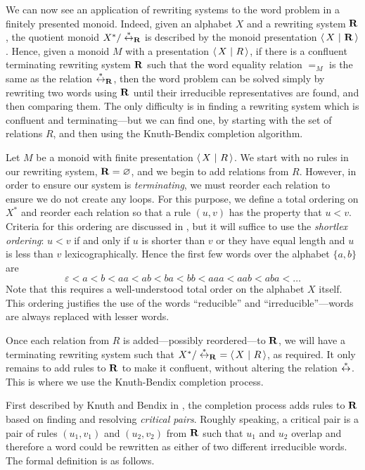 We can now see an application of rewriting systems to the word problem in a
finitely presented monoid.  Indeed, given an alphabet $X$ and a rewriting system
$\mathbf{R}$, the quotient monoid $X^* / \stackrel{*}{\leftrightarrow}_{\mathbf{R}}$ is described by the
monoid presentation $\left\langle\,X ~\middle|~ \mathbf{R}\,\right\rangle$.  Hence, given a monoid $M$ with a
presentation $\left\langle\,X ~\middle|~ R\,\right\rangle$, if there is a confluent terminating rewriting system
$\mathbf{R}$ such that the word equality relation $=_M$ is the same as the
relation $\stackrel{*}{\leftrightarrow}_{\mathbf{R}}$, then the word problem can be solved
simply by rewriting two words using $\mathbf{R}$ until their irreducible
representatives are found, and then comparing them.  The only difficulty is in
finding a rewriting system which is confluent and terminating---but we can find
one, by starting with the set of relations $R$, and then using the Knuth-Bendix
completion algorithm.

Let $M$ be a monoid with finite presentation $\left\langle\,X ~\middle|~ R\,\right\rangle$.
We start with no rules in our rewriting system, $\mathbf{R} = \varnothing$, and
we begin to add relations from $R$.  However, in order to ensure our system is
\textit{terminating}, we must reorder each relation to ensure we do not create
any loops.  For this purpose, we define a total ordering on $X^*$ and reorder
each relation so that a rule $(u, v)$ has the property that $u < v$.  Criteria
for this ordering are discussed in \cite[p.~420]{cgt}, but it will suffice to
use the \textit{shortlex ordering}: $u < v$ if and only if $u$ is shorter than
$v$ or they have equal length and $u$ is less than $v$ lexicographically.  Hence the
first few words over the alphabet $\{a, b\}$ are
$$\varepsilon < a < b < aa < ab < ba < bb < aaa < aab < aba < \ldots$$
Note that this requires a well-understood total order on the alphabet $X$
itself.  This ordering justifies the use of the words ``reducible'' and
``irreducible''---words are always replaced with lesser words.

Once each relation from $R$ is added---possibly reordered---to $\mathbf{R}$, we
will have a terminating rewriting system such that
$X^* / \stackrel{*}{\leftrightarrow}_{\mathbf{R}}\ = \left\langle\,X ~\middle|~ R\,\right\rangle$, as required.  It only remains to add
rules to $\mathbf{R}$ to make it confluent, without altering the relation
$\stackrel{*}{\leftrightarrow}$.  This is where we use the Knuth-Bendix completion process.

First described by Knuth and Bendix in \cite{knuth_bendix}, the completion
process adds rules to $\mathbf{R}$ based on finding and resolving
\textit{critical pairs}.  Roughly speaking, a critical pair is a pair of rules $(u_1, v_1)$ and
$(u_2, v_2)$ from $\mathbf{R}$ such that $u_1$ and $u_2$ overlap and therefore a word could be
rewritten as either of two different irreducible words.  The formal definition
is as follows.

